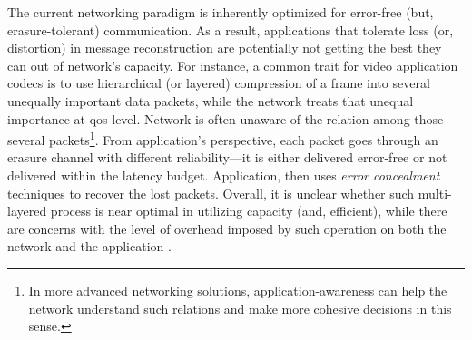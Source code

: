 The current networking paradigm is inherently optimized for error-free (but, erasure-tolerant) communication. As a result, applications that tolerate loss (or, distortion) in message reconstruction are potentially not getting the best they can out of network's capacity. For instance, a common trait for video application codecs is to use hierarchical (or layered) compression of a frame into several unequally important data packets, while the network treats that unequal importance at \gls{qos} level. Network is often unaware of the relation among those several packets\footnote{In more advanced networking solutions, application-awareness can help the network understand such relations and make more cohesive decisions in this sense.}. %
From application's perspective, each  packet goes through an erasure channel with different reliability---it is either delivered error-free or not delivered within the  latency budget. Application, then uses  \emph{error concealment} techniques \cite{aign1995temporal} to recover  the lost packets. Overall, it is unclear whether such multi-layered  process is  near optimal in utilizing capacity (and, efficient), while there are concerns with the level of overhead imposed by such operation on both the network and the application \cite{lan2021semantic}. %








